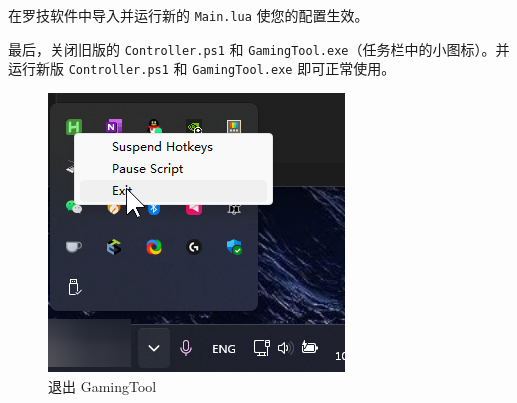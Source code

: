 在罗技软件中导入并运行新的 \lstinline{Main.lua} 使您的配置生效。

最后，关闭旧版的 \lstinline{Controller.ps1} 和 \lstinline{GamingTool.exe}（任务栏中的小图标）。并运行新版 \lstinline{Controller.ps1} 和 \lstinline{GamingTool.exe} 即可正常使用。

\begin{figure}[H]
    \Centering
    \includegraphics[width=\textwidth]{docs/assets/intro/exit_gamingtool}
    \caption{退出 GamingTool}
\end{figure}
